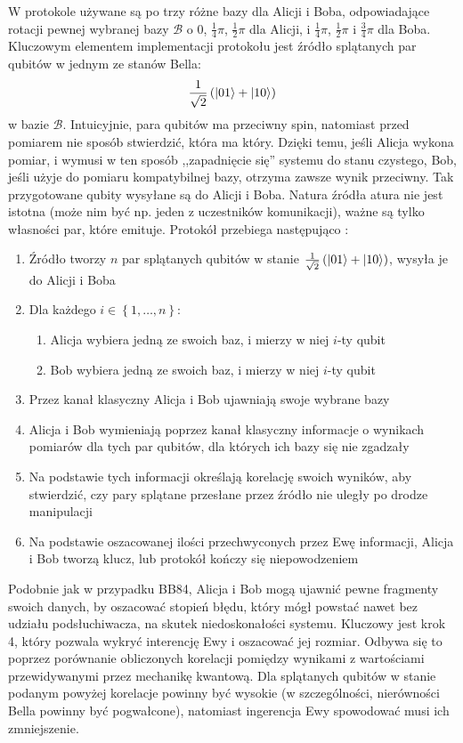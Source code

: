\documentclass[10pt]{article}
\begin{document}
W protokole używane są po trzy różne bazy dla Alicji i Boba, odpowiadające rotacji pewnej wybranej
bazy \(\mathcal{B}\) o \(0\), \(\frac{1}{4}\pi\), \(\frac{1}{2}\pi\) dla Alicji, i \(\frac{1}{4}\pi\), 
\(\frac{1}{2}\pi\) i \(\frac{3}{4}\pi\) dla Boba. Kluczowym elementem implementacji protokołu jest 
źródło splątanych par qubitów w jednym ze stanów Bella:
\[
\frac{1}{\sqrt{2}}\left(\Ket{01}+\Ket{10}\right)
\]
w bazie \(\mathcal{B}\). Intuicyjnie, para qubitów ma przeciwny spin, natomiast przed pomiarem nie 
sposób stwierdzić, która ma który. Dzięki temu, jeśli Alicja wykona pomiar, i wymusi w ten sposób 
,,zapadnięcie się'' systemu do stanu czystego, Bob, jeśli użyje do pomiaru kompatybilnej bazy, otrzyma
zawsze wynik przeciwny. Tak przygotowane qubity wysyłane są do Alicji i Boba. Natura źródła atura nie 
jest  istotna (może nim być np. jeden z uczestników komunikacji), ważne są tylko własności par, które
emituje. Protokół przebiega następująco \cite{Ilic07}:

\begin{enumerate}
  \item Źródło tworzy \(n\) par splątanych qubitów w stanie \(\frac{1}{\sqrt{2}}\left(\Ket{01}+
    \Ket{10}\right)\), wysyła je do Alicji i Boba
  \item Dla każdego \(i\in\left\{1,\ldots,n\right\}\):
    \begin{enumerate}
      \item Alicja wybiera jedną ze swoich baz, i mierzy w niej \(i\)-ty qubit
      \item Bob wybiera jedną ze swoich baz, i mierzy w niej \(i\)-ty qubit
    \end{enumerate}
  \item Przez kanał klasyczny Alicja i Bob ujawniają swoje wybrane bazy
  \item Alicja i Bob wymieniają poprzez kanał klasyczny informacje o wynikach pomiarów dla tych
    par qubitów, dla których ich bazy się nie zgadzały
  \item Na podstawie tych informacji określają korelację swoich wyników, aby stwierdzić, czy pary
    splątane przesłane przez źródło nie uległy po drodze manipulacji
  \item Na podstawie oszacowanej ilości przechwyconych przez Ewę informacji, Alicja i Bob tworzą
    klucz, lub protokół kończy się niepowodzeniem 
\end{enumerate}

Podobnie jak w przypadku BB84, Alicja i Bob mogą ujawnić pewne fragmenty swoich danych, by oszacować
stopień błędu, który mógł powstać nawet bez udziału podsłuchiwacza, na skutek niedoskonałości systemu.
Kluczowy jest krok 4, który pozwala wykryć interencję Ewy i oszacować jej rozmiar. Odbywa się to
poprzez porównanie obliczonych korelacji pomiędzy wynikami z wartościami przewidywanymi przez mechanikę
kwantową. Dla splątanych qubitów w stanie podanym powyżej korelacje powinny być wysokie (w szczególności, nierówności Bella powinny być pogwałcone), natomiast ingerencja Ewy spowodować musi ich zmniejszenie.

\nocite{*}



\end{document}
